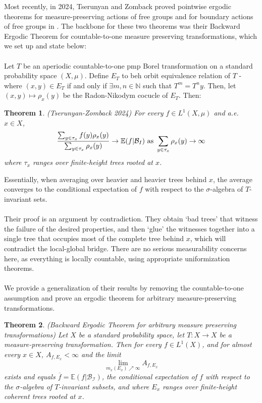 \documentclass{article}
\newcommand{\N}{\mathbb{N}}
\newtheorem{theorem}{Theorem}[section]
\theoremstyle{definition}
\begin{document}
\noindent Most recently, in 2024, Tserunyan and Zomback proved pointwise ergodic theorems for measure-preserving actions of free groups and for boundary actions of free groups in \cite{anushpaper}. The backbone for these two theorems was their Backward Ergodic Theorem for countable-to-one measure preserving transformations, which we set up and state below:\\\\
Let $ T $ be an aperiodic countable-to-one pmp Borel transformation on a standard probability space $ (X,\mu) $. Define $ E_T $ to beh orbit equivalence relation of $ T $ - where $ (x,y)\in E_T $ if and only if $ \exists m,n\in \N $ such that $ T^m = T^n y $. Then, let $ (x,y)\mapsto \rho_x(y) $ be the Radon-Nikodym cocucle of $ E_T $. Then:
\begin{theorem}
    \label{countable-to-one}(Tserunyan-Zomback 2024) For every $ f\in L^1(X,\mu) $ and a.e. $ x\in X $, 
    \[
    \frac{\sum_{y\in \tau_x} f(y)\rho_x(y) }{\sum_{y\in \tau_x}\rho_x(y)} \rightarrow \mathbb{E}(f|\mathcal{B}_I) \textmd{ as }\sum_{y\in \tau_x}\rho_x(y)\rightarrow \infty 
    \]
    where $ \tau_x $ ranges over finite-height trees rooted at $ x $. 
\end{theorem}
\noindent Essentially, when averaging over heavier and heavier trees behind $ x $, the average converges to the conditional expectation of $ f $ with respect to the $ \sigma $-algebra of $ T $-invariant sets.\\\\
Their proof is an argument by contradiction. They obtain `bad trees' that witness the failure of the desired properties, and then `glue' the witnesses together into a single tree that occupies most of the complete tree behind $ x $, which will contradict the local-global bridge. There are no serious measurability concerns here, as everything is locally countable, using appropriate uniformization theorems.\\\\
We provide a generalization of their results by removing the countable-to-one assumption and prove an ergodic theorem for arbitrary measure-preserving transformations.
\begin{theorem}
    (Backward Ergodic Theorem for arbitrary measure preserving transformations) Let $ X $ be a standard probability space, let $ T:X\rightarrow X $ be a measure-preserving transformation. Then for every $ f\in L^1(X) $, and for almost every $x \in X $, $ A_{f,E_x} <\infty $ and the limit
    \[
    \lim_{m_x(E_x)\nearrow \infty} A_{f,E_x} 
    \]
    exists and equals $ \overline{f}= \mathbb{E}(f|\mathcal{B}_{\mathcal{I}}) $, the conditional expectation of $ f $ with respect to the $ \sigma $-algebra of $ T $-invariant subsets, and where $ E_x $ ranges over finite-height coherent trees rooted at $ x $.
\end{theorem}
\end{document}
